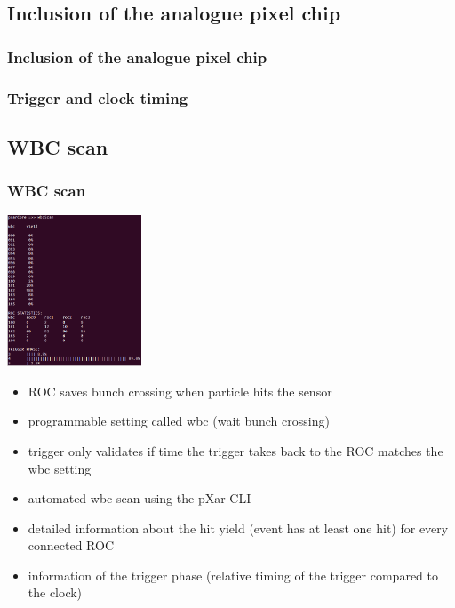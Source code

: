 \documentclass[9pt]{beamer}
\begin{document}
\subsection{Inclusion of the analogue pixel chip}
\begin{frame}
	\frametitle{Inclusion of the analogue pixel chip}
\end{frame}
\begin{frame}
	\frametitle{Trigger and clock timing}
\end{frame}
\subsection{WBC scan}
\begin{frame}
	\frametitle{WBC scan}
	\begin{center}
		\begin{minipage}{4.0cm}
			\centering
			\includegraphics[width=4.0cm]{Pics/wbcscan1}
		\end{minipage}
		\hspace*{2pt}
		\begin{minipage}{7cm}
			\begin{itemize}
				\item ROC saves bunch crossing when particle hits the sensor
				\item programmable setting called wbc (wait bunch crossing)
				\item trigger only validates if time the trigger takes back to the ROC matches the wbc setting
				\item automated wbc scan using the pXar CLI
				\item detailed information about the hit yield (event has at least one hit) for every connected ROC
				\item information of the trigger phase (relative timing of the trigger compared to the clock)
			\end{itemize}
		\end{minipage}\no\s
	\end{center}
\end{frame}
\end{document}
